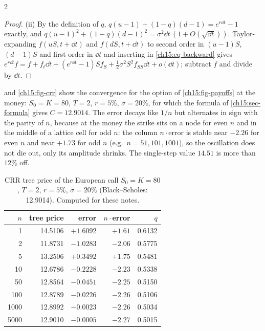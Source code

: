 \begin{paracol}{2}
\begin{proof}
(ii) By the definition of $q$, $q(u-1)+(1-q)(d-1)=e^{r\dd t}-1$ exactly, and $q(u-1)^2+(1-q)(d-1)^2=\sigma^2\dd t\,(1+O(\sqrt{\dd t}))$. Taylor-expanding
$f(uS,t+\dd t)$ and $f(dS,t+\dd t)$ to second order in $(u-1)S$, $(d-1)S$ and first order in $\dd t$ and inserting in \eqref{ch15:eq-backward} gives
$e^{r\dd t}f=f+f_t\dd t+(e^{r\dd t}-1)Sf_S+\tfrac12\sigma^2S^2f_{SS}\dd t+o(\dd t)$; subtract $f$ and divide by $\dd t$.
\end{proof}

 and \cref{ch15:fig-crr} show the convergence for the option of \cref{ch15:fig-payoffs} at the money:
$S_0=K=80$, $T=2$, $r=5\%$, $\sigma=20\%$, for which the formula of \cref{ch15:sec-formula} gives $C=12.9014$. The error decays like $1/n$ but alternates in sign
with the parity of $n$, because at the money the strike sits on a node for even $n$ and in the middle of a lattice cell for odd $n$: the column $n\cdot\text{error}$ is
stable near $-2.26$ for even $n$ and near $+1.73$ for odd $n$ (e.g.\ $n=51,101,1001$), so the oscillation does not die out, only its amplitude shrinks. The single-step value $14.51$ is more than $12\%$ off.

\begin{table}[ht]
\centering\small
\begin{tabular}{r r r r r}
\toprule
$n$ & tree price & error & $n\cdot$error & $q$\\
\midrule
1 & 14.5106 & $+1.6092$ & $+1.61$ & 0.6132\\
2 & 11.8731 & $-1.0283$ & $-2.06$ & 0.5775\\
5 & 13.2506 & $+0.3492$ & $+1.75$ & 0.5481\\
10 & 12.6786 & $-0.2228$ & $-2.23$ & 0.5338\\
50 & 12.8564 & $-0.0451$ & $-2.25$ & 0.5150\\
100 & 12.8789 & $-0.0226$ & $-2.26$ & 0.5106\\
1000 & 12.8992 & $-0.0023$ & $-2.26$ & 0.5034\\
5000 & 12.9010 & $-0.0005$ & $-2.27$ & 0.5015\\
\bottomrule
\end{tabular}
\caption{CRR tree price of the European call $S_0=K=80$, $T=2$, $r=5\%$, $\sigma=20\%$ (Black--Scholes: 12.9014). Computed for these notes.}\label{ch15:tab-crr}
\end{table}


\end{paracol}
